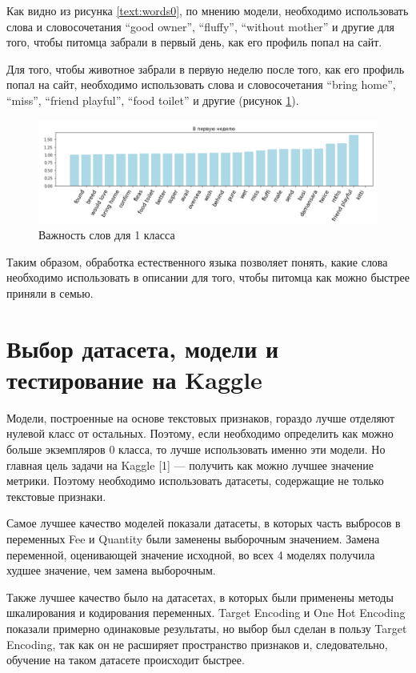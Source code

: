 \documentclass[14pt]{mmcs_article}
\begin{document}
Как видно из рисунка \ref{text:words0}, по мнению модели, необходимо использовать слова и словосочетания “good owner”, “fluffy”, “without mother” и другие для того, чтобы питомца забрали в первый день, как его профиль попал на сайт.

Для того, чтобы животное забрали в первую неделю после того, как его профиль попал на сайт, необходимо использовать слова и словосочетания “bring home”, “miss”, “friend playful”, “food toilet” и другие (рисунок \ref{text:words1}).


\begin{figure}[H]
	\centering
	\includegraphics[scale=0.55]{words1.png}
	\caption{Важность слов для 1 класса}\label{text:words1}
\end{figure}

Таким образом, обработка естественного языка позволяет понять, какие слова необходимо использовать в описании для того, чтобы питомца как можно быстрее приняли в семью.


\newpage
\section{Выбор датасета, модели и тестирование на Kaggle}

Модели, построенные на основе текстовых признаков, гораздо лучше отделяют нулевой класс от остальных. Поэтому, если необходимо определить как можно больше экземпляров 0 класса, то лучше использовать именно эти модели.
Но главная цель задачи на Kaggle [1] — получить как можно лучшее значение метрики. Поэтому необходимо использовать датасеты, содержащие не только текстовые признаки. 

Самое лучшее качество моделей показали датасеты, в которых часть выбросов в переменных Fee и Quantity были заменены выборочным значением. Замена переменной, оценивающей значение исходной, во всех 4 моделях получила худшее значение, чем замена выборочным. 

Также лучшее качество было на датасетах, в которых были применены методы шкалирования и кодирования переменных. Target Encoding и One Hot Encoding показали примерно одинаковые результаты, но выбор был сделан в пользу Target Encoding, так как он не расширяет пространство признаков и, следовательно, обучение на таком датасете происходит быстрее.
\end{document}
